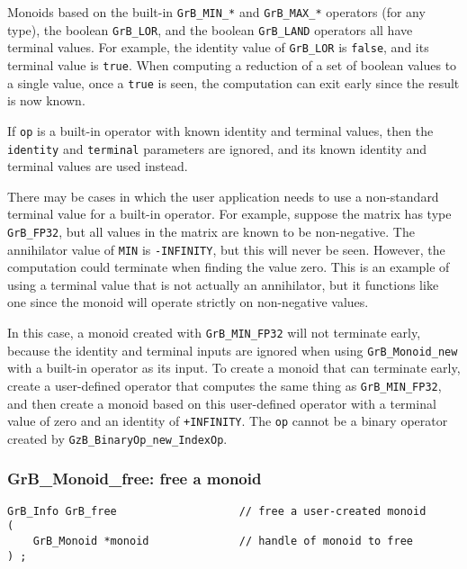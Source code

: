 \documentclass[12pt]{article}
\begin{document}
Monoids based on the built-in \verb'GrB_MIN_*' and \verb'GrB_MAX_*' operators
(for any type), the boolean \verb'GrB_LOR', and the boolean \verb'GrB_LAND'
operators all have terminal values.  For example, the identity value of
\verb'GrB_LOR' is \verb'false', and its terminal value is \verb'true'.  When
computing a reduction of a set of boolean values to a single value, once a
\verb'true' is seen, the computation can exit early since the result is now
known.

If \verb'op' is a built-in operator with known identity and terminal values,
then the \verb'identity' and \verb'terminal' parameters are ignored, and its
known identity and terminal values are used instead.

There may be cases in which the user application needs to use a non-standard
terminal value for a built-in operator.  For example, suppose the matrix has
type \verb'GrB_FP32', but all values in the matrix are known to be
non-negative.  The annihilator value of \verb'MIN' is \verb'-INFINITY', but
this will never be seen.  However, the computation could terminate when
finding the value zero.  This is an example of using a terminal value that is
not actually an annihilator, but it functions like one since the monoid will
operate strictly on non-negative values.

In this case, a monoid created with \verb'GrB_MIN_FP32' will not terminate
early, because the identity and terminal inputs are ignored when using
\verb'GrB_Monoid_new' with a built-in operator as its input.
To create a monoid that can terminate early, create a user-defined operator
that computes the same thing as \verb'GrB_MIN_FP32', and then create a monoid
based on this user-defined operator with a terminal value of zero and an
identity of \verb'+INFINITY'.
%
The \verb'op' cannot be a binary operator
created by \verb'GzB_BinaryOp_new_IndexOp'.

\subsubsection{{\sf GrB\_Monoid\_free:} free a monoid}
\label{monoid_free}

\begin{mdframed}[userdefinedwidth=6in]
{\footnotesize
\begin{verbatim}
GrB_Info GrB_free                   // free a user-created monoid
(
    GrB_Monoid *monoid              // handle of monoid to free
) ;
\end{verbatim}
} \end{mdframed}
\end{document}
